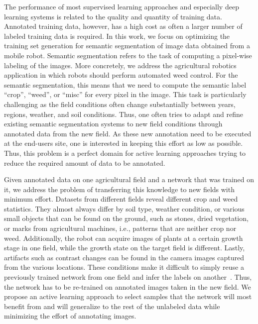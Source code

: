 \documentclass[letterpaper, 10 pt, conference]{ieeeconf}  %
\begin{document}
The performance of most supervised learning approaches and especially deep
learning  systems is related to the quality and quantity of training data.
Annotated training data, however, has a high cost as often a larger number of
labeled training data is  required.  In this work, we focus on optimizing the
training set generation for  semantic segmentation of image data obtained
from a mobile robot. Semantic segmentation refers to the task of computing a
pixel-wise  labeling of the images. More concretely, we address the
agricultural robotics  application in which robots should perform automated
weed control. For the semantic  segmentation, this means that we need to
compute the semantic label ``crop'', ``weed'',  or ``misc'' for every pixel in
the image. This task is particularly challenging  as the field conditions
often change substantially between years, regions, weather, and  soil
conditions. Thus, one often tries to adapt and refine existing semantic
segmentation systems to new field conditions through annotated data from the
new field. As these new annotation need to be executed at the end-users site,
one is interested in keeping this effort as low as possible. Thus, this
problem is a perfect domain for active  learning approaches trying to reduce
the required amount of data to be annotated.

Given annotated data on one agricultural field and a network that was trained
on it, we address the problem of transferring this knowledge to new fields with
minimum effort.  Datasets from different fields reveal different crop and weed
statistics. They almost  always differ by soil type, weather condition, or
various small objects that can be found  on the ground, such as stones, dried
vegetation, or marks from agricultural machines,  i.e., patterns that are
neither crop nor weed. Additionally, the robot can acquire  images of plants
at a certain growth stage in one field, while the growth state on the  target
field is different. Lastly, artifacts such as contrast changes can be found in
the camera images captured from the various locations.  These conditions make
it difficult to simply reuse a previously trained network from one  field and
infer the labels on another~\cite{lottes2018ral,lottes2017iros}. Thus, 
the network has to be
re-trained on  annotated images taken in the new field. We propose an
active learning  approach to select samples that the network will most benefit
from and will generalize  to the rest of the unlabeled data while minimizing
the effort of annotating images.
\end{document}

